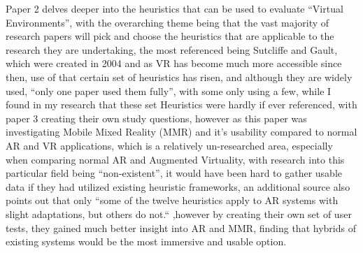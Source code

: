 \documentclass{scrartcl}
\begin{document}
Paper 2\cite{hvannberg2012exploitation} delves deeper into the heuristics that can be used to evaluate ``Virtual Environments'', with the overarching theme being that the vast majority of research papers will pick and choose the heuristics that are applicable to the research they are undertaking, the most referenced being Sutcliffe and Gault, which were created in 2004 and as VR has become much more accessible since then, use of that certain set of heuristics has risen, and although they are widely used, ``only one paper used them fully''\cite{hvannberg2012exploitation}, with some only using a few, while I found in my research that these set Heuristics were hardly if ever referenced, with paper 3\cite{venta2014investigating} creating their own study questions, however as this paper was investigating Mobile Mixed Reality (MMR) and it's usability compared to normal AR and VR applications, which is a relatively un-researched area, especially when comparing normal AR and Augmented Virtuality, with research into this particular field being ``non-existent''\cite{venta2014investigating}, it would have been hard to gather usable data if they had utilized existing heuristic frameworks, an additional source also points out that only ``some of the twelve heuristics apply to AR systems with slight adaptations, but others do not.``\cite{furht2011handbook} ,however by creating their own set of user tests, they gained much better insight into AR and MMR, finding that hybrids of existing systems would be the most immersive and usable option.\\
\end{document}
